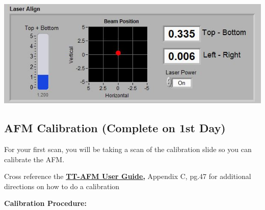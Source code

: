 \documentclass{../lab}
\begin{document}
\begin{center}
    \href{http://experimentationlab.berkeley.edu/sites/default/files/AFMImages/detectoralign.JPG}{\includegraphics[width=0.5\linewidth]{images/detectoralign.JPG}}
\end{center}

\subsection{AFM Calibration (Complete on 1st Day)}

For your first scan, you will be taking a scan of the calibration slide so you can calibrate the AFM.

Cross reference the \href{http://experimentationlab.berkeley.edu/tt-afmuserguidev2.2}{\textbf{TT-AFM User Guide,}} Appendix C, pg.47 for additional directions on how to do a calibration

\textbf{Calibration Procedure:}
\end{document}
